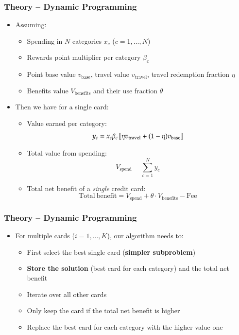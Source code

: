 \begin{frame}
    \frametitle{Theory -- Dynamic Programming}
    \begin{itemize}
        \item<+-> Assuming:
        \begin{itemize}
            \item Spending in $N$ categories $x_{c}$ ($c = 1, \ldots, N$)
            \item Rewards point multiplier per category $\beta_{c}$
            \item Point base value $v_{\mathrm{base}}$, travel value $v_{\mathrm{travel}}$, travel redemption fraction $\eta$
            \item Benefits value $V_{\mathrm{benefits}}$ and their use fraction $\theta$
        \end{itemize}    
        \item<+-> Then we have for a single card:
        \begin{itemize}
            \item Value earned per category: 
            \[ y_{c} =  x_{c}\/\beta_{c} \left[ \eta\/ v_{\mathrm{travel}} + 
            (1 - \eta)\/ v_{\mathrm{base}}\right] \] 
        
            \item Total value from spending: 
            \[ V_{\mathrm{spend}} =  \sum_{c=1}^{N} y_{c} \]

            \item Total net benefit of a \emph{single} credit card: 
            \[ 
                \mathrm{Total\ benefit} = V_{\mathrm{spend}} + 
            \theta \cdot V_{\mathrm{benefits}} - \mathrm{Fee} 
            \]     
        \end{itemize}
    \end{itemize}
\end{frame}    

\begin{frame}
    \frametitle{Theory -- Dynamic Programming}
    \begin{itemize}
        \item<+-> For multiple cards ($i = 1,\ldots, K$), our algorithm needs to:
        \begin{itemize}
            \item First select the best single card ({\bf simpler subproblem})
            \item {\bf Store the solution} (best card for each category) and the total net benefit
            \item Iterate over all other cards
            \item Only keep the card if the total net benefit is higher
            \item Replace the best card for each category with the higher value one
        \end{itemize}    
     \end{itemize}
\end{frame}    

